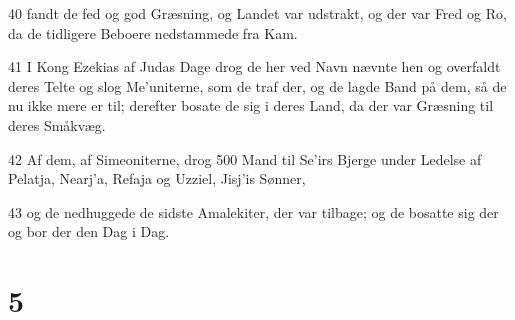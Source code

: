 \par 40 fandt de fed og god Græsning, og Landet var udstrakt, og der var Fred og Ro, da de tidligere Beboere nedstammede fra Kam.
\par 41 I Kong Ezekias af Judas Dage drog de her ved Navn nævnte hen og overfaldt deres Telte og slog Me'uniterne, som de traf der, og de lagde Band på dem, så de nu ikke mere er til; derefter bosate de sig i deres Land, da der var Græsning til deres Småkvæg.
\par 42 Af dem, af Simeoniterne, drog 500 Mand til Se'irs Bjerge under Ledelse af Pelatja, Nearj'a, Refaja og Uzziel, Jisj'is Sønner,
\par 43 og de nedhuggede de sidste Amalekiter, der var tilbage; og de bosatte sig der og bor der den Dag i Dag.

\chapter{5}

